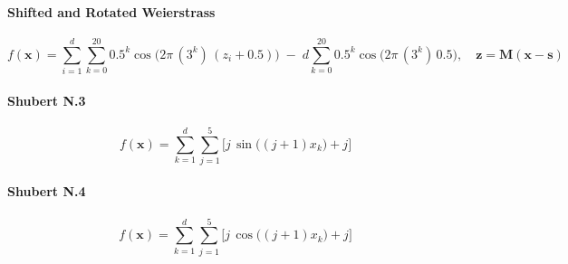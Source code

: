 \vspace{.095em}
\paragraph{Shifted and Rotated Weierstrass}
\begin{equation}
f(\mathbf{x})
= \sum_{i=1}^d \sum_{k=0}^{20} 0.5^k
\cos\!\bigl(2\pi\,(3^k)\,(z_i+0.5)\bigr)
\;-\;d \sum_{k=0}^{20} 0.5^k
\cos\!\bigl(2\pi\,(3^k)\,0.5\bigr),
\quad \mathbf{z} = \mathbf{M}(\mathbf{x}-\mathbf{s})
\label{ben:ShiftedRotatedWeierstrass}
\end{equation}





\vspace{.095em}
\paragraph{Shubert N.3}
\begin{equation}
f(\mathbf{x})
= \sum_{k=1}^{d}\sum_{j=1}^{5}\bigl[j\,\sin\bigl((j+1)x_{k}\bigr)+j\bigr]
\label{ben:ShubertN3}
\end{equation}

\vspace{.095em}
\paragraph{Shubert N.4}
\begin{equation}
f(\mathbf{x})
= \sum_{k=1}^{d}\sum_{j=1}^{5}\bigl[j\,\cos\bigl((j+1)x_{k}\bigr)+j\bigr]
\label{ben:ShubertN4}
\end{equation}


